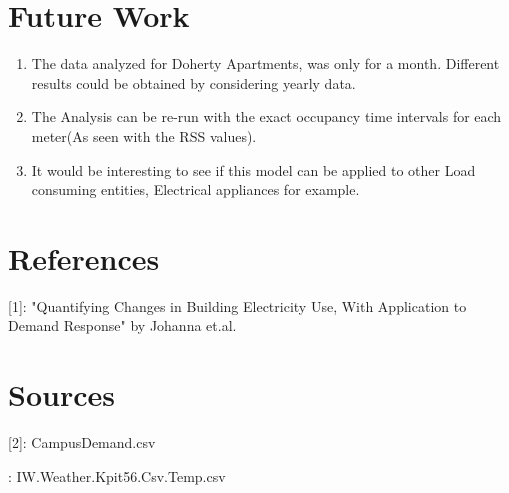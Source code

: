 \documentclass[a4paper,11pt]{article}
\begin{document}
\section{Future Work}
\begin{enumerate}
\itemsep0em
\item The data analyzed for Doherty Apartments, was only for a month. Different results could be obtained by considering yearly data. 
\item The Analysis can be re-run with the exact occupancy time intervals for each meter(As seen with the RSS values).
\item It would be interesting to see if this model can be applied to other Load consuming entities, Electrical appliances for example.
\end{enumerate}
\section{References}
[1]: "Quantifying Changes in Building Electricity Use, With Application to Demand Response" by Johanna et.al.
\section{Sources}
[2]: CampusDemand.csv

\noindent [3]: IW.Weather.Kpit56.Csv.Temp.csv
\end{document}
